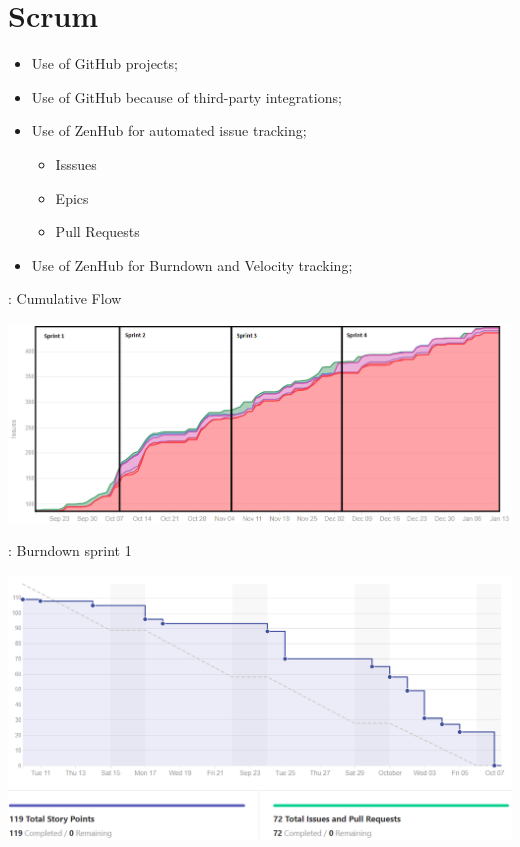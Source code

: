 \section{Scrum}

\begin{frame}{\secname}
	\begin{itemize}
		\item Use of GitHub projects;
		\item Use of GitHub because of third-party integrations;		
		\item Use of ZenHub for automated issue tracking;
		\begin{itemize}
			\item Isssues
			\item Epics
			\item Pull Requests
		\end{itemize}
		\item Use of ZenHub for Burndown and Velocity tracking;
	\end{itemize}
\end{frame}

\begin{frame}{\secname: Cumulative Flow}
	\begin{center}
		\includegraphics[width=\linewidth]{images/flow.png}
	\end{center}
\end{frame}

\begin{frame}{\secname: Burndown sprint 1}
	\begin{center}
		\includegraphics[width=\linewidth]{images/burn1.png}
	\end{center}
\end{frame}

